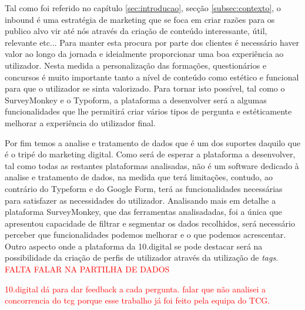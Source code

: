 Tal como foi referido no capítulo \ref{sec:introducao}, secção \ref{subsec:contexto}, o inbound é uma estratégia de marketing que se foca em criar razões para os publico alvo vir até nós através da criação de conteúdo interessante, útil, relevante etc... Para manter esta procura por parte dos clientes é necessário haver valor ao longo da jornada e ideialmente proporcionar uma boa experiência ao utilizador. Nesta medida a personalização das formações, questionários e concursos é muito importante tanto a nível de conteúdo como estético e funcional para que o utilizador se sinta valorizado. Para tornar isto possível, tal como o SurveyMonkey e o Typoform, a plataforma a desenvolver será a algumas funcionalidades que lhe permitirá criar vários tipos de pergunta e estéticamente melhorar a experiência do utilizador final.



Por fim temos a analise e tratamento de dados que é um dos suportes daquilo que é o tripé do marketing digital. Como será de esperar a plataforma a desenvolver, tal como todas as restantes plataformas analisadas, não é um software dedicado à analise e tratamento de dados, na medida que terá limitações, contudo, ao contrário do Typeform e do Google Form, terá as funcionalidades necessárias para satisfazer as necessidades do utilizador. Analisando mais em detalhe a plataforma SurveyMonkey, que das ferramentas analisadadas, foi a única que apresentou capacidade de filtrar e segmentar os dados recolhidos, será necessário perceber que funcionalidades podemos melhorar e o que podemos acrescentar. Outro aspecto onde a plataforma da 10.digital se pode destacar será na possibilidade da criação de perfis de utilizador através da utilização de \textit{tags}. 
\textcolor{red}{ FALTA FALAR NA PARTILHA DE DADOS}

\textcolor{red}{
10.digital dá para dar feedback a cada pergunta.
falar que não analisei a concorrencia do tcg porque esse trabalho já foi feito pela equipa do TCG.
}




